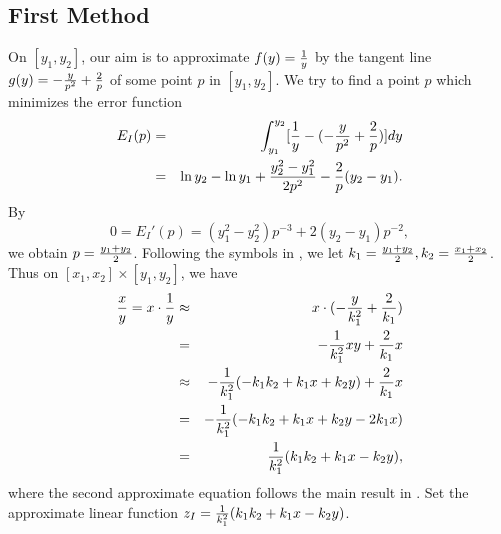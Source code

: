 \documentclass[conference]{IEEEtran}
\begin{document}
\subsection{First Method}
\label{First3.1}
On $[y_{1}, y_{2}]$, our aim is to approximate $f(y)={1\over y}$ by the tangent line $g(y)=-{y\over p^{2}}+{2\over p}$ of some point $p$ in $[y_{1}, y_{2}]$. We try to find
a point $p$ which minimizes the error function
\begin{eqnarray}
E_{I}(p)&=&\int_{y_{1}}^{y_{2}}[{1\over y}-(-{y\over p^{2}}+{2\over p})]dy\nonumber\\
&=&\ln y_{2}-\ln y_{1}+{y_{2}^{2}-y_{1}^{2}\over 2p^{2}}-{2\over p}(y_{2}-y_{1}).\nonumber
\end{eqnarray}
By $$0=E_{I}'(p)=(y_{1}^{2}-y_{2}^{2})p^{-3}+2(y_{2}-y_{1})p^{-2},$$
we obtain $p={y_{1}+y_{2}\over 2}$. Following the symbols in \cite{CTChen}, we let $k_{1}={y_{1}+y_{2}\over 2}, k_{2}={x_{1}+x_{2}\over 2}$. Thus on $[x_{1}, x_{2}]\times [y_{1}, y_{2}]$,
we have
\begin{eqnarray}
{x\over y}=x\cdot{1\over y}&\approx&x\cdot(-{y\over k_{1}^{2}}+{2\over k_{1}})\nonumber\\
&=&-{1\over k_{1}^{2}}xy+{2\over k_{1}}x\nonumber\\
&\approx&-{1\over k_{1}^{2}}(-k_{1}k_{2}+k_{1}x+k_{2}y)+{2\over k_{1}}x\nonumber\\
&=&-{1\over k_{1}^{2}}(-k_{1}k_{2}+k_{1}x+k_{2}y-2k_{1}x)\nonumber\\
&=&{1\over k_{1}^{2}}(k_{1}k_{2}+k_{1}x-k_{2}y),\label{FirstMethod}
\end{eqnarray}
where the second approximate equation follows the main result in \cite{CTChen}. Set the approximate linear function $z_{I}={1\over k_{1}^{2}}(k_{1}k_{2}+k_{1}x-k_{2}y)$.
\end{document}
